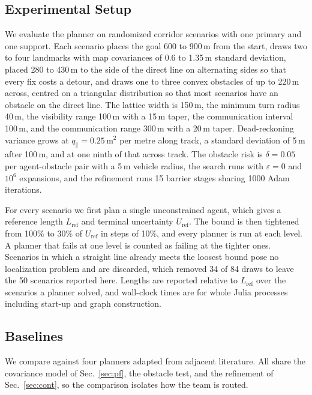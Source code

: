 \documentclass[letterpaper, 10 pt, conference]{ieeeconf}
\theoremstyle{remark}
\begin{document}
\subsection{Experimental Setup}

We evaluate the planner on randomized corridor scenarios with one primary and
one support. Each scenario places the goal 600 to 900\,m from the start,
draws two to four landmarks with map covariances of 0.6 to 1.35\,m standard
deviation, placed 280 to 430\,m to the side of the direct line on
alternating sides so that every fix costs a detour, and draws one to three
convex obstacles of up to 220\,m across, centred on a triangular
distribution so that most scenarios have an obstacle on the direct line. The
lattice width is 150\,m, the minimum turn radius 40\,m, the visibility range
100\,m with a 15\,m taper, the communication interval 100\,m, and the
communication range 300\,m with a 20\,m taper. Dead-reckoning variance grows
at $q_\parallel = 0.25$\,m$^2$ per metre along track, a standard deviation
of 5\,m after 100\,m, and at one ninth of that across track. The obstacle
risk is $\delta = 0.05$ per agent-obstacle pair with a 5\,m vehicle radius,
the search runs with $\varepsilon = 0$ and $10^6$ expansions, and the
refinement runs 15 barrier stages sharing 1000 Adam iterations.

For every scenario we first plan a single unconstrained agent, which gives a
reference length $L_\mathrm{ref}$ and terminal uncertainty $U_\mathrm{ref}$.
The bound is then tightened from 100\% to 30\% of $U_\mathrm{ref}$ in steps
of 10\%, and every planner is run at each level. A planner that fails at one
level is counted as failing at the tighter ones. Scenarios in which a
straight line already meets the loosest bound pose no localization problem
and are discarded, which removed 34 of 84 draws to leave the 50 scenarios
reported here. Lengths are reported relative to $L_\mathrm{ref}$ over the
scenarios a planner solved, and wall-clock times are for whole Julia
processes including start-up and graph construction.

\subsection{Baselines}

We compare against four planners adapted from adjacent literature. All share
the covariance model of Sec.~\ref{sec:pf}, the obstacle test, and the
refinement of Sec.~\ref{sec:cont}, so the comparison isolates how the team
is routed.
\end{document}
